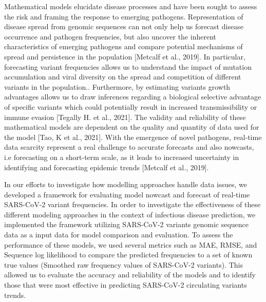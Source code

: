 \documentclass[11pt,oneside,letterpaper]{article}
\begin{document}
Mathematical models elucidate disease processes and have been sought to assess the risk and framing the response to emerging pathogens. 
Representation of disease spread from genomic sequences can not only help us forecast disease occurrence and pathogen frequencies, but also uncover the inherent characteristics of emerging pathogens and compare potential mechanisms of spread and persistence in the population [Metcalf et al., 2019].
In particular, forecasting variant frequencies allows us to understand the impact of mutation accumulation and viral diversity on the spread and competition of different variants in the population.. 
Furthermore, by estimating variants growth advantages allows us to draw inferences regarding a biological selective advantage of specific variants which could potentially result in increased transmissibility or immune evasion [Tegally H. et al., 2021]. 
The validity and reliability of these mathematical models are dependent on the quality and quantity of data used for the model [Tao, K et al., 2021].
With the emergence of novel pathogens, real-time data scarcity represent a real challenge to accurate forecasts and also nowcasts, i.e forecasting on a short-term scale, as it leads to 
increased uncertainty in identifying and forecasting epidemic trends [Metcalf et al., 2019].


In our efforts to investigate how modelling approaches handle data issues, we developed a framework for evaluating model nowcast and forecast of real-time SARS-CoV-2 variant frequencies.
In order to investigate the effectiveness of these different modeling approaches in the context of infectious disease prediction, we implemented the framework utilizing SARS-CoV-2 variants genomic sequence data as a input data for model comparison and evaluation.
To assess the performance of these models, we used several metrics such as MAE, RMSE, and Sequence log likelihood to compare the predicted frequencies to a set of known true values (Smoothed raw frequency values of SARS-CoV-2 variants). %
This allowed us to evaluate the accuracy and reliability of the models and to identify those that were most effective in predicting SARS-CoV-2 circulating variants trends.
\end{document}
